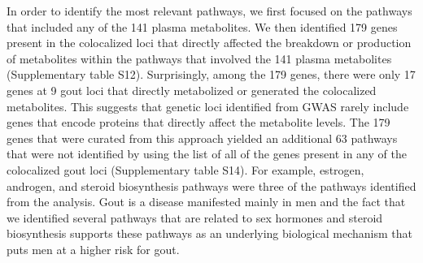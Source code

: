 \documentclass[gucdd,article,submit,pdftex,moreauthors]{Definitions/mdpi}
\begin{document}
In order to identify the most relevant pathways, we first focused on the pathways that included any of the 141 plasma metabolites.
We then identified 179 genes present in the colocalized loci that directly affected the breakdown or production of metabolites within the pathways that involved the 141 plasma metabolites (Supplementary table S12).
Surprisingly, among the 179 genes, there were only 17 genes at 9 gout loci that directly metabolized or generated the colocalized metabolites.
This suggests that genetic loci identified from GWAS rarely include genes that encode proteins that directly affect the metabolite levels.
The 179 genes that were curated from this approach yielded an additional 63 pathways that were not identified by using the list of all of the genes present in any of the colocalized gout loci (Supplementary table S14).
For example, estrogen, androgen, and steroid biosynthesis pathways were three of the pathways identified from the analysis.
Gout is a disease manifested mainly in men \citep{dalbeth_gout_2021,chen-xu_contemporary_2019} and the fact that we identified several pathways that are related to sex hormones and steroid biosynthesis supports these pathways as an underlying biological mechanism that puts men at a higher risk for gout.
\end{document}

